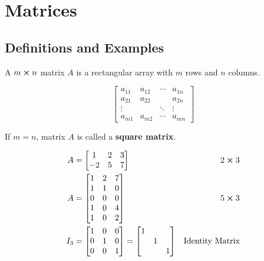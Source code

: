\chapter{Matrices}

\section{Definitions and Examples}

\begin{definition}
	A $m \cross n$ matrix $A$ is a rectangular array with $m$ rows and $n$ columns.

	\[\begin{bmatrix}
		a_{11} & a_{12} & \cdots & a_{1n}\\
		a_{21} & a_{22} & & a_{2n}\\
		\vdots & & \ddots & \vdots \\
		a_{m1} & a_{m2} & \cdots & a_{mn}
	\end{bmatrix}\]
\end{definition}

\begin{remark}
	If $m=n$, matrix $A$ is called a \textbf{square matrix}.
\end{remark}

\begin{example}
	\begin{align}
		A &= \begin{bmatrix}
			1&2&3\\-2&5&7
		\end{bmatrix} &2 \cross 3\\
		A &= \begin{bmatrix}
			1&2&7\\1&1&0\\0&0&0\\1&0&4\\1&0&2
		\end{bmatrix} &5 \cross 3\\
		I_3 &= \begin{bmatrix}
			1&0&0\\
			0&1&0\\
			0&0&1
		\end{bmatrix} = \begin{bmatrix}
			1&&\\&1&\\&&1
		\end{bmatrix} &\text{Identity Matrix}
	\end{align}
\end{example}

